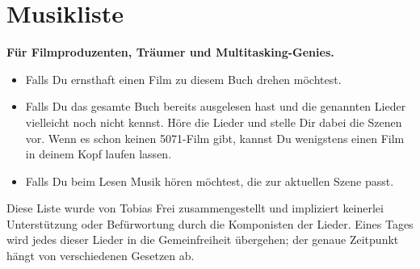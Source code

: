 \chapter{Musikliste}

\textbf{Für Filmproduzenten, Träumer und Multitasking-Genies.}

\begin{itemize}
    \item Falls Du ernsthaft einen Film zu diesem Buch drehen möchtest.
    \item Falls Du das gesamte Buch bereits ausgelesen hast und die genannten Lieder vielleicht noch nicht kennst. Höre die Lieder und stelle Dir dabei die Szenen vor. Wenn es schon keinen 5071-Film gibt, kannst Du wenigstens einen Film in deinem Kopf laufen lassen.
    \item Falls Du beim Lesen Musik hören möchtest, die zur aktuellen Szene passt.
\end{itemize}

Diese Liste wurde von Tobias Frei zusammengestellt und impliziert keinerlei Unterstützung oder Befürwortung durch die Komponisten der Lieder. Eines Tages wird jedes dieser Lieder in die Gemeinfreiheit übergehen; der genaue Zeitpunkt hängt von verschiedenen Gesetzen ab.

